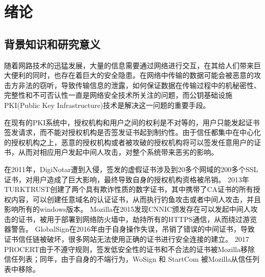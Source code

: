 
\chapter{绪论}

\section{背景知识和研究意义}

随着网路技术的迅猛发展，大量的信息需要通过网络进行交互，在其给人们带来巨大便利的同时，也存在着巨大的安全隐患。在网络中传输的数据可能会被恶意的攻击方非法的窃听，导致传输信息的泄露，如何保证数据在传输过程中的机秘密性、完整性和不可否认性一直是网络安全技术所关注的问题，而公钥基础设施PKI(Public Key Infrastructure)技术是解决这一问题的重要手段。






在现有的PKI系统中，授权机构和用户之间的权利是不对等的，用户只能发起证书签发请求，而不能对授权机构是否签发证书起到制约性。由于信任都集中在中心化的授权机构之上，恶意的授权机构或者被攻破的授权机构将可以签发任意用户的证书，从而对相应用户发起中间人攻击，对整个系统带来恶劣的影响。

在2011年，DigiNotar遭到入侵，签发的虚假证书涉及到20多个网域的200多个SSL证书\cite{prins2011diginotar}，对用户造成了巨大影响，最终导致自身的授权机构资格被吊销。
2013年TURKTRUST创建了两个具有欺诈性质的数字证书，其中携带了CA证书的所有授权内容，可以创建任意域名的认证证书，从而执行钓鱼攻击或者中间人攻击，并且影响所有的windows版本。%
Mozilla在2015发现CNNIC颁发存在可以发起中间人攻击的证书，被用于部署到网络防火墙中，劫持所有的HTTPS通信，从而绕过游览器警告。
GlobalSign在2016年由于自身操作失误，吊销了错误的中间证书，导致证书信任链被破坏，很多网站无法使用正确的证书进行安全连接的建立。
2017 PROCERT由于不遵守规则，签发低安全性的证书和不合法的证书被Mozilla移除信任列表；同年，由于自身的不端行为，WoSign 和 StartCom 被Mozilla从信任列表中移除。


